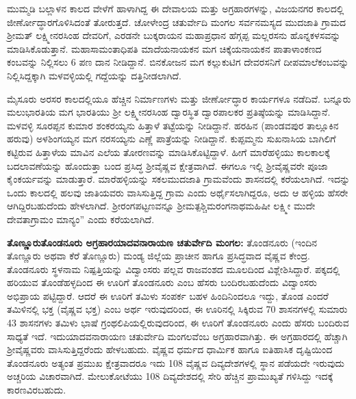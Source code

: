ಮುಮ್ಮಡಿ ಬಲ್ಲಾಳನ ಕಾಲದ ವೇಳೆಗೆ ಹಾಳಾಗಿದ್ದ ಈ ದೇವಾಲಯ ಮತ್ತು ಅಗ್ರಹಾರಗಳನ್ನು, ವಿಜಯನಗರ ಕಾಲದಲ್ಲಿ ಜೀರ್ಣೋದ್ಧಾರಗೊಳಿಸಿದಂತೆ ತೋರುತ್ತದೆ. ಚೋಳೇಂದ್ರ ಚತುರ್ವೇದಿ ಮಂಗಲ ಸರ್ವನಮಸ್ಯದ ಮುದಜಾತಿ ಗ್ರಾಮದ ಶ‍್ರೀಮತ್​ ಲಕ್ಷ್ಮೀನರಸಿಂಹ ದೇವರಿಗೆ, ಎರಡನೇ ಬುಕ್ಕರಾಯನ ಮಹಾಪ್ರಧಾನ ಹೆಗ್ಗಪ್ಪ ಮಲ್ಲರಸನು ಹೊನ್ನಕಳಸವನ್ನು ಮಾಡಿಸಿಕೊಡುತ್ತಾನೆ. ಮಹಾಸಾಮಂತಾಧಿಪತಿ ಮಾದೆಯನಾಯಕನ ಮಗ ಚಿಕ್ಕೆಯನಾಯಕನ ಪಾತಾಳಾಂಕಣದ ಕಂಬವನ್ನು ನಿಲ್ಲಿಸಲು 6 ಪಣ ದಾನ ನೀಡಿದ್ದಾನೆ. ಬಿನಕೋಜನ ಮಗ ಕಲ್ಲುಕುಟಿಗ ದೇವರಸನಿಗೆ ದೀಪಮಾಲೆಕಂಬವನ್ನು ನಿಲ್ಲಿಸಿದ್ದಕ್ಕಾಗಿ ಮಳವಳ್ಳಿಯಲ್ಲಿ ಗದ್ದೆಯನ್ನು ದತ್ತಿನೀಡಲಾಗಿದೆ.

ಮೈಸೂರು ಅರಸರ ಕಾಲದಲ್ಲಿಯೂ ಹೆಚ್ಚಿನ ನಿರ್ಮಾಣಗಳು ಮತ್ತು ಜೀರ್ಣೋದ್ಧಾರ ಕಾರ್ಯಗಳೂ ನಡೆದಿವೆ. ಬನ್ನೂರು ಮಲುಭಾರತಿಯ ಮಗ ಭಾರತಿಯು ಶ‍್ರೀ ಲಕ್ಷ್ಮೀನರಸಿಂಹ ದ್ವಾರಸ್ಥಿತ ದ್ವಾರಪಾಲಕರ ಪ್ರತಿಷ್ಠೆಯನ್ನು ಮಾಡಿಸಿದ್ದಾನೆ. ಮಳವಳ್ಳಿ ಸೂರಪ್ಪನ ಕುಮಾರ ಶಂಕರಯ್ಯನು ಹಿತ್ತಾಳೆ ತಟ್ಟೆಯನ್ನು ನೀಡಿದ್ದಾನೆ. ಹರಹಿನ (ಪಾಂಡವಪುರ ತಾಲ್ಲೂಕಿನ ಹರುವು) ಅಳಶಿಂಗಯ್ಯನ ಮಗ ನರಸಯ್ಯನು ಎಣ್ಣೆ ಪಾತ್ರೆಯನ್ನು ನೀಡಿದ್ದಾನೆ. ಕುಪ್ಪಮ್ಮನು ಸುಖನಾಸಿಯ ಬಾಗಿಲಿಗೆ ಕಟ್ಟಿರುವ ಹಿತ್ತಾಳೆಯ ಮಾವಿನ ಎಲೆಯ ತೋರಣವನ್ನು ಮಾಡಿಸಿಕೊಟ್ಟಿದ್ದಾಳೆ. ಹೀಗೆ ಮಾರೆಹಳ್ಳಿಯು ಕಾಲಕಾಲಕ್ಕೆ ಬದಲಾವಣೆಯನ್ನು ಹೊಂದುತ್ತಾ ಬಂದ ಪ್ರಸಿದ್ಧ ಶ‍್ರೀವೈಷ್ಣವ ಕ್ಷೇತ್ರವಾಗಿದೆ. ಈಗಲೂ ಇಲ್ಲಿ ಶ‍್ರೀವೈಷ್ಣವರೇ ಪೂಜಾ ಕೈಂಕರ್ಯವನ್ನು ಮಾಡುತ್ತಾರೆ. ಮಾರೆಹಳ್ಳಿಯನ್ನು ಸಕಲಮುದಜಾತಿ ಗ್ರಾಮವೆಂದು ಶಾಸನದಲ್ಲಿ ಕರೆಯಲಾಗಿದೆ. ಇದನ್ನು ಒಂದು ಕಾಲದಲ್ಲಿ ಹಲವು ಜಾತಿಯವರು ವಾಸಿಸುತ್ತಿದ್ದ ಗ್ರಾಮ ಎಂದು ಅರ್ಥೈಸಲಾಗಿದ್ದರೂ, ಅದು ಆ ಹಳ್ಳಿಯ ಹೆಸರೇ ಆಗಿದ್ದಿರಬಹುದೆಂದು ಹೇಳಲಾಗಿದೆ. ಶ‍್ರೀರಂಗಪಟ್ಟಣವನ್ನೂ ಶ‍್ರೀಮತ್ಪಶ್ಚಿಮರಂಗನಾಥಮಹಿಷೀ ಲಕ್ಷ್ಮೀ ಮುದೇ ದೇವತಾಗ್ರಾಮಂ ಮಾನ್ಯಂ” ಎಂದು ಕರೆಯಲಾಗಿದೆ.

\textbf{ತೊಣ್ಣೂರು\general{\enginline{-}}ತೊಂಡನೂರು ಅಗ್ರಹಾರ\general{\enginline{-}}ಯಾದವನಾರಾಯಣ ಚತುರ್ವೇದಿ ಮಂಗಲ: } ತೊಂಡನೂರು (ಇಂದಿನ ತೊಣ್ಣೂರು ಅಥವಾ ಕೆರೆ ತೊಣ್ಣೂರು) ಮಂಡ್ಯ ಜಿಲ್ಲೆಯ ಪ್ರಾಚೀನ ಹಾಗೂ ಪ್ರಸಿದ್ಧವಾದ ವೈಷ್ಣವ ಕೇಂದ್ರ. ತೊಂಡನೂರು ಸ್ಥಳನಾಮ ನಿಷ್ಪತ್ತಿಯನ್ನು ವಿದ್ವಾಂಸರು ಪಲ್ಲವ ರಾಜವಂಶದ ಮೂಲದಿಂದ ವಿಶ್ಲೇಶಿಸಿದ್ದಾರೆ. ಪಕ್ಕದಲ್ಲಿ ಹರಿಯುವ ತೊಂಡೆಹಳ್ಳದಿಂದ ಈ ಊರಿಗೆ ತೊಂಡನೂರು ಎಂಬ ಹೆಸರು ಬಂದಿರಬಹುದೆಂದು ವಿದ್ವಾಂಸರು ಅಭಿಪ್ರಾಯ ಪಟ್ಟಿದ್ದಾರೆ. ಆದರೆ ಈ ಊರಿಗೆ ತಮಿಳು ಸಂಪರ್ಕ ಬಹಳ ಹಿಂದಿನಿಂದಲೂ ಇದ್ದು, ತೊಂಡ ಎಂದರೆ ತಮಿಳಿನಲ್ಲಿ ಭಕ್ತ (ವೈಷ್ಣವ ಭಕ್ತ) ಎಂಬ ಅರ್ಥ ಇರುವುದರಿಂದ, ಈ ಊರಿನಲ್ಲಿ ಸಿಕ್ಕಿರುವ 70 ಶಾಸನಗಳಲ್ಲಿ ಸುಮಾರು 43 ಶಾಸನಗಳು ತಮಿಳು ಭಾಷೆ ಗ್ರಂಥಲಿಪಿಯಲ್ಲಿರುವುದರಿಂದ, ಈ ಊರಿಗೆ ತೊಂಡನೂರು ಎಂದು ಹೆಸರು ಬಂದಿರುವ ಸಾಧ್ಯತೆ ಇದೆ. ಇದು\break ಯಾದವನಾರಾಯಣ ಚತುರ್ವೇದಿ ಮಂಗಲವೆಂಬ ಅಗ್ರಹಾರವಾಗಿತ್ತು. ಈ ಅಗ್ರಹಾರದಲ್ಲಿ ಹೆಚ್ಚಾಗಿ ಶ‍್ರೀವೈಷ್ಣವರು ವಾಸಿಸುತ್ತಿದ್ದರೆಂದು ಹೇಳಬಹುದು. ವೈಷ್ಣವ ಧರ್ಮದ ಧಾರ್ಮಿಕ ಹಾಗೂ ಐತಿಹಾಸಿಕ ದೃಷ್ಟಿಯಿಂದ ತೊಂಡನೂರು ಅತ್ಯಂತ ಪ್ರಮುಖ ಕ್ಷೇತ್ರವಾದರೂ ಇದು 108 ವೈಷ್ಣವ ದಿವ್ಯದೇಶಗಳಲ್ಲಿ ಸ್ಥಾನ ಪಡೆಯದೇ ಇರುವುದು ಅಚ್ಚರಿಯ ವಿಚಾರವಾಗಿದೆ. ಮೇಲುಕೋಟೆಯು 108 ದಿವ್ಯದೇಶದಲ್ಲಿ ಸೇರಿ ಹೆಚ್ಚಿನ ಪ್ರಾಮುಖ್ಯತೆ ಗಳಿಸಿದ್ದು ಇದಕ್ಕೆ ಕಾರಣವಿರಬಹುದು.

